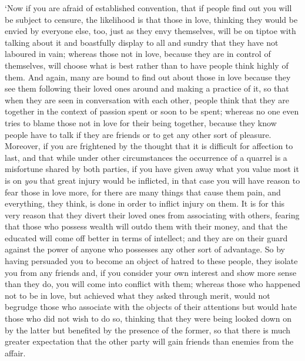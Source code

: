‘Now if you are afraid of established convention, that if 
people find out you will be subject to censure, the likelihood is that
those in love, thinking they would be envied by everyone else, too, just
as they envy themselves, will be on tiptoe with talking about it and
boastfully display to all and sundry that they have not laboured in
vain; whereas those not in love,  because they are in control of
themselves, will choose what is best rather than to have people think
highly of them. And again, many are bound to find out about those in
love because they see them following their loved ones around and making
a practice  of it, so that when they are seen in conversation
with each other, people think that they are together in the context of
passion spent or soon to be spent; whereas no one even tries to blame
those not in love for their being together, because they  know
people have to talk if they are friends or to get any other sort of
pleasure. Moreover, if you are frightened by the thought that it is
difficult for affection to last, and that while under other
circumstances the occurrence of a quarrel is a misfortune shared by both
parties, if you have given away what you value  most it is on
{\em you} that great injury would be inflicted, in that case you will
have reason to fear those in love more, for there are many things that
cause them pain, and everything, they think, is done in order to inflict
injury on them. It is for this  very reason that they divert
their loved ones from associating with others, fearing that those who
possess wealth will outdo them with their money, and that the educated
will come off better in terms of intellect; and they are on their guard
against the power of anyone who possesses any other sort of advantage.
 So by having persuaded you to become an object of hatred to
these people, they isolate you from any friends and, if you consider
your own interest and show more sense than they do, you will come into
conflict with them; whereas those who happened not to be in love, but
achieved what they asked  through merit, would not begrudge
those who associate with the objects of their attentions but would hate
those who did not wish to do so, thinking that they were being looked
down on by the latter but benefited by the presence of the former, so
that there is much greater expectation that the other party will
 gain friends than enemies from the affair.

